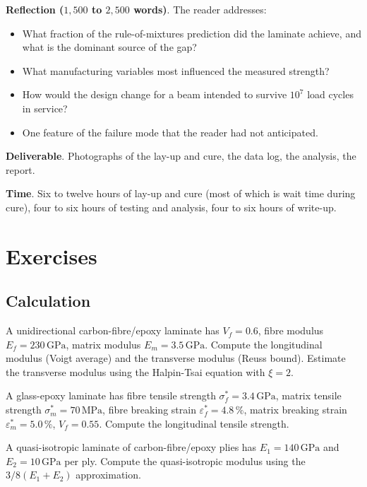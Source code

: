 \begin{project}
\textbf{Reflection ($1{,}500$ to $2{,}500$ words)}. The reader
addresses:

\begin{itemize}[leftmargin=*]
\item What fraction of the rule-of-mixtures prediction did the
  laminate achieve, and what is the dominant source of the gap?
\item What manufacturing variables most influenced the measured
  strength?
\item How would the design change for a beam intended to survive
  $10^7$ load cycles in service?
\item One feature of the failure mode that the reader had not
  anticipated.
\end{itemize}

\textbf{Deliverable}. Photographs of the lay-up and cure, the data
log, the analysis, the report.

\textbf{Time}. Six to twelve hours of lay-up and cure (most of which
is wait time during cure), four to six hours of testing and analysis,
four to six hours of write-up.
\end{project}

\section{Exercises}

\subsection*{Calculation}

\begin{exercise}
A unidirectional carbon-fibre/epoxy laminate has $V_f = 0.6$, fibre
modulus $E_f = 230\,\text{GPa}$, matrix modulus $E_m = 3.5\,\text{GPa}$.
Compute the longitudinal modulus (Voigt average) and the transverse
modulus (Reuss bound). Estimate the transverse modulus using the
Halpin-Tsai equation with $\xi = 2$.
\end{exercise}

\begin{exercise}
A glass-epoxy laminate has fibre tensile strength $\sigma_f^* = 3.4\,
\text{GPa}$, matrix tensile strength $\sigma_m^* = 70\,\text{MPa}$,
fibre breaking strain $\varepsilon_f^* = 4.8\,\%$, matrix breaking
strain $\varepsilon_m^* = 5.0\,\%$, $V_f = 0.55$. Compute the
longitudinal tensile strength.
\end{exercise}

\begin{exercise}
A quasi-isotropic laminate of carbon-fibre/epoxy plies has $E_1 =
140\,\text{GPa}$ and $E_2 = 10\,\text{GPa}$ per ply. Compute the
quasi-isotropic modulus using the $3/8 (E_1 + E_2)$ approximation.
\end{exercise}

